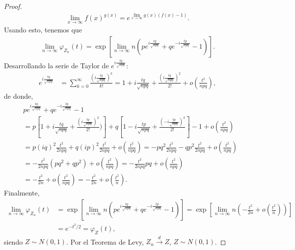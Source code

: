 \begin{obs}
\begin{proof}
\begin{align*}
            \lim_{x \to \infty} f(x)^{g(x)} = e^{\lim_{x \to \infty} g(x)(f(x) - 1)}.
        \end{align*}
        Usando esto, tenemos que
        \begin{align*}
            \lim_{n \to \infty} \varphi_{Z_n}(t) = \exp\left[ \lim_{n \to \infty} n\left(pe^{i\frac{tq}{\sqrt{npq}}} + qe^{-i\frac{tp}{\sqrt{npq}}} - 1 \right) \right].
        \end{align*}
        Desarrollando la serie de Taylor de $e^{i\frac{tq}{\sqrt{npq}}}$:
        \begin{align*}
            e^{i\frac{tq}{\sqrt{npq}}} & = \sum_{k=0}^{\infty} \frac{\left( i \frac{tq}{\sqrt{npq}} \right)^k}{k!} = 1 + i\frac{tq}{\sqrt{npq}} + \frac{\left( i\frac{tq}{\sqrt{npq}} \right)^2}{2!} + o\left( \frac{t^2}{npq} \right),
        \end{align*}
        de donde,
        \begin{align*}
             & pe^{i\frac{tq}{\sqrt{npq}}} + qe^{-i\frac{tp}{\sqrt{npq}}} - 1                                                                           \\
             & = p\left[ 1 + i\frac{tq}{\sqrt{npq}} + \frac{\left( i\frac{tq}{\sqrt{npq}} \right)^2}{2!}) \right]
            + q \left[ 1 - i\frac{tp}{\sqrt{npq}} + \frac{\left( -i\frac{tp}{\sqrt{npq}} \right)^2}{2!} \right] -1 + o\left( \frac{t^2}{npq} \right)    \\
             & = p(iq)^2 \frac{t^2}{2npq} + q(ip)^2 \frac{t^2}{2npq} + o\left( \frac{t^2}{npq} \right)
            = -pq^2 \frac{t^2}{2npq} - qp^2 \frac{t^2}{2npq} + o\left( \frac{t^2}{npq} \right)                                                          \\
             & = -\frac{t^2}{2npq} \left(pq^2 + qp^2 \right) + o\left( \frac{t^2}{npq} \right) = -\frac{t^2}{2npq} pq + o\left( \frac{t^2}{npq} \right) \\
             & = -\frac{t^2}{2n} + o\left( \frac{t^2}{npq} \right) = -\frac{t^2}{2n} + o\left( \frac{t^2}{n} \right).
        \end{align*}
        Finalmente,
        \begin{align*}
            \lim_{n \to \infty} \varphi_{Z_n}(t) & = \exp\left[ \lim_{n \to \infty} n\left(pe^{i\frac{tq}{\sqrt{npq}}} + qe^{-i\frac{tp}{\sqrt{npq}}} - 1 \right) \right]
            = \exp\left[ \lim_{n \to \infty} n \left( -\frac{t^2}{2n} + o\left( \frac{t^2}{n} \right) \right) \right]                                                     \\
                                                 & = e^{-t^2/2} = \varphi_Z(t),
        \end{align*}
        siendo $Z \sim N(0,1)$. Por el Teorema de Levy, $Z_n \xrightarrow[]{d} Z$, $Z \sim N(0,1)$.
    \end{proof}
\end{obs}

